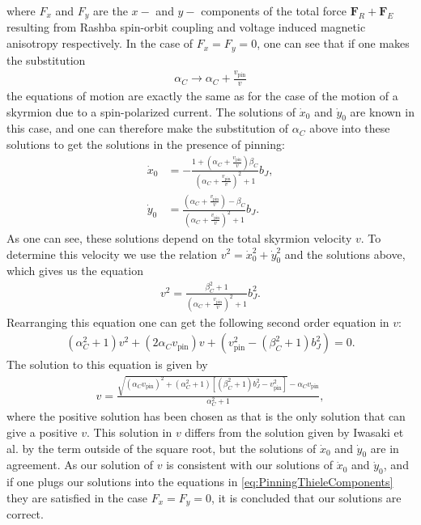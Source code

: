 where $F_x$ and $F_y$ are the $x-$ and $y-$ components of the total force $\mathbold{F}_R + \mathbold{F}_E$ resulting from Rashba spin-orbit coupling and voltage induced magnetic anisotropy respectively. In the case of $F_x = F_y = 0$, one can see that if one makes the substitution
\begin{align}
\alpha_C \rightarrow \alpha_C+\frac{v_{\textrm{pin}}}{v}
\end{align}
the equations of motion are exactly the same as for the case of the motion of a skyrmion due to a spin-polarized current. The solutions of $\dot{x}_0$ and $\dot{y}_0$ are known in this case, and one can therefore make the substitution of $\alpha_C$ above into these solutions to get the solutions in the presence of pinning:
\begin{subequations}
\begin{align}
\dot{x}_0 &= -\frac{1+(\alpha_C+\frac{v_{\textrm{pin}}}{v})\beta_C}{(\alpha_C+\frac{v_{\textrm{pin}}}{v})^2+1}b_J, \\
\dot{y}_0 &= \frac{(\alpha_C+\frac{v_{\textrm{pin}}}{v}) - \beta_C}{(\alpha_C+\frac{v_{\textrm{pin}}}{v})^2+1}b_J.
\end{align}
\end{subequations}
As one can see, these solutions depend on the total skyrmion velocity $v$. To determine this velocity we use the relation $v^2 = \dot{x}_0^2+\dot{y}_0^2$ and the solutions above, which gives us the equation
\begin{align}
v^2 = \frac{\beta_C^2+1}{(\alpha_C+\frac{v_{\textrm{pin}}}{v})^2+1}b_J^2.
\end{align}
Rearranging this equation one can get the following second order equation in $v$:
\begin{align}
(\alpha_C^2+1)v^2+(2\alpha_Cv_{\textrm{pin}})v + (v_{\textrm{pin}}^2-(\beta_C^2+1)b_J^2) = 0.
\end{align}
The solution to this equation is given by
\begin{align}
v = \frac{\sqrt{(\alpha_Cv_{\textrm{pin}})^2+(\alpha_C^2+1)\left[(\beta_C^2+1)b_J^2-v_{\textrm{pin}}^2\right]}-\alpha_Cv_{\textrm{pin}}}{\alpha_C^2+1},
\end{align}
where the positive solution has been chosen as that is the only solution that can give a positive $v$. This solution in $v$ differs from the solution given by Iwasaki et al. \cite{IwasakiNagaosa2013} by the term outside of the square root, but the solutions of $\dot{x}_0$ and $\dot{y}_0$ are in agreement. As our solution of $v$ is consistent with our solutions of $\dot{x}_0$ and $\dot{y}_0$, and if one plugs our solutions into the equations in \eqref{eq:PinningThieleComponents} they are satisfied in the case $F_x = F_y = 0$, it is concluded that our solutions are correct. 

